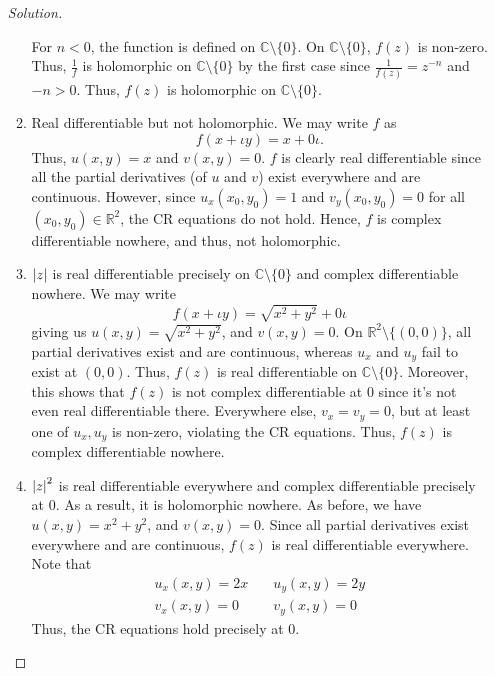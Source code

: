 \documentclass[11pt]{article}
\theoremstyle{definition}
\newenvironment{soln}{\begin{proof}[Solution]}{\end{proof}}
\begin{document}
\begin{enumerate}[leftmargin=*]
\begin{soln}
\begin{enumerate}
        \medskip
        
        For $n < 0$, the function is defined on $\mathbb{C} \setminus \{0\}$. On $\mathbb{C} \setminus \{0\}$, $f(z)$ is non-zero. Thus, $\frac{1}{f}$ is holomorphic on $\mathbb{C} \setminus \{0\}$ by the first case since $\frac{1}{f(z)} = z^{-n}$ and $-n > 0$. Thus, $f(z)$ is holomorphic on $\mathbb{C} \setminus \{0\}$.
        
        \item Real differentiable but not holomorphic. We may write $f$ as
        \[
            f(x+\iota y) = x + 0\iota.
        \]
        Thus, $u(x,y) = x$ and $v(x,y) = 0$. $f$ is clearly real differentiable since all the partial derivatives (of $u$ and $v$) exist everywhere and are continuous. However, since $u_x(x_0,y_0) = 1$ and $v_y(x_0,y_0) = 0$ for all $(x_0,y_0) \in \mathbb{R}^2$, the CR equations do not hold. Hence, $f$ is complex differentiable nowhere, and thus, not holomorphic.
        
        \item $\abs{z}$ is real differentiable precisely on $\mathbb{C} \setminus \{0\}$ and complex differentiable nowhere. We may write
        \[
            f(x+\iota y) = \sqrt{x^2 + y^2} + 0\iota
        \]
        giving us $u(x,y) = \sqrt{x^2 + y^2}$, and $v(x,y) = 0$. On $\mathbb{R}^2\setminus\{(0,0)\}$, all partial derivatives exist and are continuous, whereas $u_x$ and $u_y$ fail to exist at $(0,0)$. Thus, $f(z)$ is real differentiable on $\mathbb{C} \setminus \{0\}$. Moreover, this shows that $f(z)$ is not complex differentiable at $0$ since it's not even real differentiable there. Everywhere else, $v_x = v_y = 0$, but at least one of $u_x, u_y$ is non-zero, violating the CR equations. Thus, $f(z)$ is complex differentiable nowhere.
        
        \item $\abs{z}^2$ is real differentiable everywhere and complex differentiable precisely at $0$. As a result, it is holomorphic nowhere. As before, we have $u(x,y) = x^2 + y^2$, and $v(x,y) = 0$. Since all partial derivatives exist everywhere and are continuous, $f(z)$ is real differentiable everywhere. Note that
        \begin{align*}
            u_x(x,y) = 2x &\quad u_y(x,y) = 2y \\
            v_x(x,y) = 0 &\quad v_y(x,y) = 0
        \end{align*}
        Thus, the CR equations hold precisely at $0$.
        

\end{enumerate}
\end{soln}
\end{enumerate}
\end{document}
